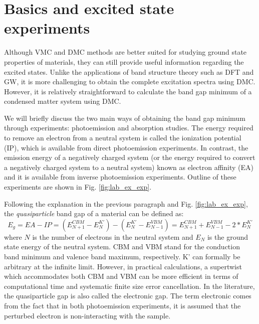 \section{Basics and excited state experiments}
Although VMC and DMC methods are better suited for studying ground state properties of materials, they can still provide useful information regarding the excited states. 
Unlike the applications of band structure theory such as DFT and GW, it is more challenging to obtain the complete excitation spectra using DMC. 
However, it is relatively straightforward to calculate the band gap minimum of a condensed matter system using DMC. 

We will briefly discuss the two main ways of obtaining the band gap minimum through experiments: photoemission and absorption studies.  
The energy required to remove an electron from a neutral system is called the ionization potential (IP), which is available from direct photoemission experiments. 
In contrast, the emission energy of a negatively charged system (or the energy required to convert a negatively charged system to a neutral system) known as electron affinity (EA) and it is available from inverse photoemission experiments. 
Outline of these experiments are shown in Fig. \ref{fig:lab_ex_exp}. 

Following the explanation in the previous paragraph and Fig. \ref{fig:lab_ex_exp}, the \textit{quasiparticle} band gap of a material can be defined as:
\begin{equation}
	E_g=EA-IP=(E_{N+1}^{CBM}-E_{N}^{K'})-(E_{N}^{K'}-E_{N-1}^{VBM})=E_{N+1}^{CBM}+E_{N-1}^{VBM}-2*E_{N}^{K'}\label{eq:qp}
\end{equation}
where $N$ is the number of electrons in the neutral system and $E_{N}$ is the ground state energy of the neutral system. 
CBM and VBM stand for the conduction band minimum and valence band maximum, respectively. K' can formally be arbitrary at the infinite limit.
However, in practical calculations, a supertwist which accommodates both CBM and VBM can be more efficient in terms of computational time and systematic finite size error cancellation. 
In the literature, the quasiparticle gap is also called the electronic gap. 
The term electronic comes from the fact that in both photoemission experiments, it is assumed that the perturbed electron is non-interacting with the sample. 

